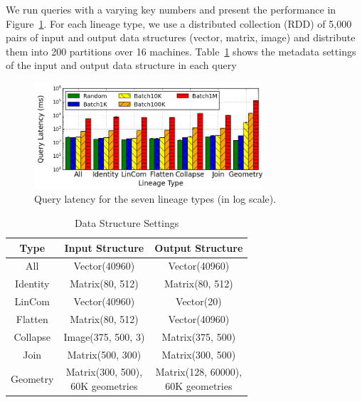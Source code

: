 \documentclass{sig-alternate}
\begin{document}
We run queries with a varying key numbers and present the performance in Figure~\ref{fig:typequery}. 
For each lineage type, we use a distributed collection (RDD) of 5,000 pairs of 
input and output data structures (vector, matrix, image) and distribute them into 200 partitions over 16 machines.
Table~\ref{tb:typequery-stats} shows the metadata settings of the input and output data structure in each query

\begin{figure}[t]
\begin{center}
    \includegraphics[width=85mm]{pictures/TypeQuery-Time}
\caption {Query latency for the seven lineage types (in log scale).
    \label{fig:typequery}
}
\end{center}
\end{figure}

\begin{table}[t]
\begin{center}
    \caption{Data Structure Settings}
    \begin{scriptsize}
    \begin{tabular}{ | c | c | c |}
    \hline
    Type & Input Structure & Output Structure \\ \hline \hline
    All & Vector(40960) & Vector(40960) \\ \hline
    Identity & Matrix(80, 512) & Matrix(80, 512) \\ \hline
    LinCom & Vector(40960) & Vector(20) \\ \hline
    Flatten & Matrix(80, 512) & Vector(40960) \\ \hline
    Collapse & Image(375, 500, 3) & Matrix(375, 500) \\ \hline
    Join & Matrix(500, 300) & Matrix(300, 500) \\ \hline
    Geometry& \shortstack[l]{Matrix(300, 500), \\60K geometries} &  \shortstack[l]{Matrix(128, 60000), \\60K geometries} \\ \hline
    \end{tabular}
    \end{scriptsize}
    \label{tb:typequery-stats}
\end{center}   
\end{table}
\end{document}
